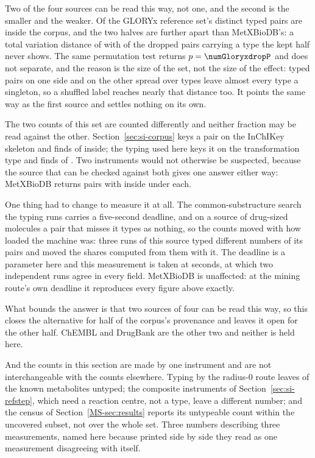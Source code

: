 \documentclass[journal=jcisd8,manuscript=suppinfo,layout=onecolumn]{achemso}
\begin{document}
Two of the four sources can be read this way, not one, and the second is the smaller and the
weaker. Of the GLORYx reference set's \numGloryxdropPairs{} distinct typed pairs
\numGloryxdropInside{} are inside the corpus, and the two halves are further apart than
MetXBioDB's: a total variation distance of \numGloryxdropTv{} with
\numGloryxdropAbsentsharePct{} of the dropped pairs carrying a type the kept half never shows.
The same permutation test returns $p=\numGloryxdropP$ and does not separate, and the reason is
the size of the set, not the size of the effect: \numGloryxdropKeptp{} typed pairs on one
side and \numGloryxdropDroppedp{} on the other spread over \numGloryxdropTypes{} types leave
almost every type a singleton, so a shuffled label reaches nearly that distance too. It points
the same way as the first source and settles nothing on its own.

The two counts of this set are counted differently and neither fraction may be read against the
other. Section~\ref{sec:si-corpus} keys a pair on the InChIKey skeleton and finds
\numAssemblyGloryxpairsinside{} of \numAssemblyGloryxpairs{} inside; the typing used here keys it
on the transformation type and finds \numGloryxdropInside{} of \numGloryxdropPairs{}. Two
instruments would not otherwise be suspected, because the source that can be checked against
both gives one answer either way: MetXBioDB returns \numMetxdropPairs{} pairs with
\numMetxdropInside{} inside under each.

One thing had to change to measure it at all. The common-substructure search the typing runs
carries a five-second deadline, and on a source of drug-sized molecules a pair that misses it
types as nothing, so the counts moved with how loaded the machine was: three runs of this source
typed different numbers of its pairs and moved the shares computed from them with it. The deadline
is a
parameter here and this measurement is taken at \numGloryxdropDeadline{} seconds, at which two
independent runs agree in every field. MetXBioDB is unaffected: at the mining route's own
deadline it reproduces every figure above exactly.

What bounds the answer is that two sources of four can be read this way, so this closes the
alternative for half of the corpus's provenance and leaves it open for the other half. ChEMBL and
DrugBank are the other two and neither is held here.

And the counts in this section are made by one instrument and are not interchangeable with the
counts elsewhere. Typing by the radius-0 route leaves \numTypeoverlapUntypeable{} of the
\numHydReferences{} known metabolites untyped; the composite instruments of
Section~\ref{sec:si-refstep}, which need a reaction centre, not a type, leave a different
number; and the census of Section~\ref{MS-sec:results} reports its untypeable count within the
uncovered subset, not over the whole set. Three numbers describing three measurements,
named here because printed side by side they read as one measurement disagreeing with itself.
\end{document}
